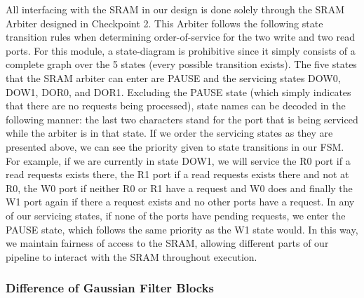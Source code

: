 \documentclass[12pt]{article}
\begin{document}
All interfacing with the SRAM in our design is done solely through the SRAM 
Arbiter designed in Checkpoint 2. This Arbiter follows the following state
transition rules when determining order-of-service for the two write and two read
ports. For this module, a state-diagram is prohibitive since it simply consists
of a complete graph over the 5 states (every possible transition exists). The 
five states that the SRAM arbiter can enter are PAUSE and the servicing states 
DOW0, DOW1, DOR0, and DOR1. Excluding the PAUSE state (which simply indicates 
that there are no requests being
processed), state names can be decoded in the following manner: the last two characters
stand for the port that is being serviced while the arbiter is in that state.
If we order the servicing states as they are presented above, we can see the priority given
to state transitions in our FSM. For example, if we are currently in state DOW1,
we will service the R0 port if a read requests exists there, the R1 port if a 
read requests exists there and not at R0, the W0 port if neither R0 or R1 have 
a request and W0 does and finally the W1 port again if there a request exists
and no other ports have a request. In any of our servicing states, if none of 
the ports have pending requests, we enter the PAUSE state, which follows the
same priority as the W1 state would. In this way, we maintain fairness of 
access to the SRAM, allowing different parts of our pipeline to interact
with the SRAM throughout execution.

\subsubsection{Difference of Gaussian Filter Blocks}
\end{document}
